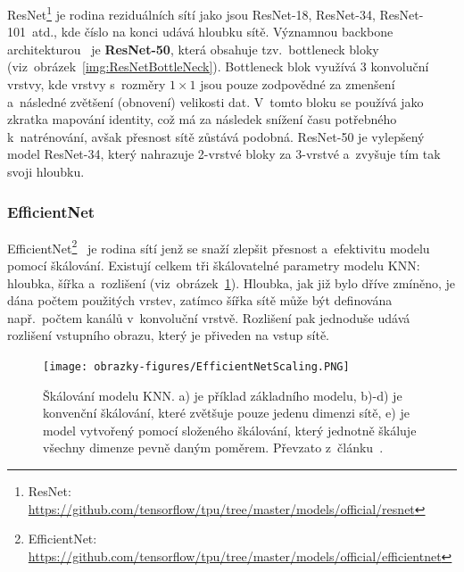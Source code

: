 ResNet\footnote{ResNet: \url{https://github.com/tensorflow/tpu/tree/master/models/official/resnet}} je rodina reziduálních sítí jako jsou ResNet-18, ResNet-34, ResNet-101~atd., kde číslo na konci udává hloubku sítě. Významnou backbone architekturou~\cite{article:DeepResNetForImg} je \textbf{ResNet-50}, která obsahuje tzv.~bottleneck bloky (viz~obrázek~\ref{img:ResNetBottleNeck}). Bottleneck blok využívá 3 konvoluční vrstvy, kde vrstvy s~rozměry $1 \times 1$ jsou pouze zodpovědné za zmenšení a~následné zvětšení (obnovení) velikosti dat. V~tomto bloku se používá jako zkratka mapování identity, což má za následek snížení času potřebného k~natrénování, avšak přesnost sítě zůstává podobná. ResNet-50 je vylepšený model ResNet-34, který nahrazuje 2-vrstvé bloky za 3-vrstvé a~zvyšuje tím tak svoji hloubku.

\subsubsection{EfficientNet}
EfficientNet\footnote{EfficientNet: \url{https://github.com/tensorflow/tpu/tree/master/models/official/efficientnet}}~\cite{website:RethinkingEfficientNet} je rodina sítí jenž se snaží zlepšit přesnost a~efektivitu modelu pomocí škálování. Existují celkem tři škálovatelné parametry modelu KNN: hloubka, šířka a~rozlišení (viz~obrázek~\ref{img:EfficientNetScaling}). Hloubka, jak již bylo dříve zmíněno, je dána počtem použitých vrstev, zatímco šířka sítě může být definována např.~počtem kanálů v~konvoluční vrstvě. Rozlišení pak jednoduše udává rozlišení vstupního obrazu, který je přiveden na vstup sítě. 

\begin{figure}[hbt]
	\centering
	\setlength{\fboxsep}{0pt}
	\texttt{[image: obrazky-figures/EfficientNetScaling.PNG]}
	\caption{Škálování modelu KNN. a) je příklad základního modelu, b)-d) je konvenční škálování, které zvětšuje pouze jedenu dimenzi sítě, e) je model vytvořený pomocí složeného škálování, který jednotně škáluje všechny dimenze pevně daným poměrem. Převzato z~článku~\cite{article:RethinkingEfficientNet}.}
	\label{img:EfficientNetScaling}
\end{figure}

